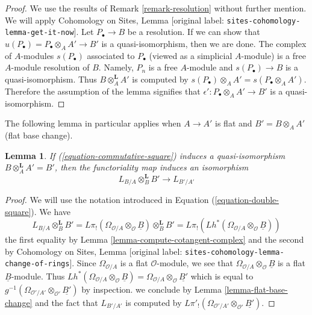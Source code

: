 \documentclass[10pt,a4paper]{article}
\theoremstyle{plain}
\newtheorem{lemma}[subsection]{Lemma}
\theoremstyle{definition}
\theoremstyle{remark}
\numberwithin{equation}{subsection}
\begin{document}
\begin{proof}
We use the results of Remark \ref{remark-resolution} without
further mention. We will apply Cohomology on Sites, Lemma
\textnormal{[original label: \nolinkurl{sites-cohomology-lemma-get-it-now}]}. Let $P_\bullet \to B$ be a resolution.
If we can show that $u(P_\bullet) = P_\bullet \otimes_A A' \to B'$
is a quasi-isomorphism, then we are done. The complex of $A$-modules
$s(P_\bullet)$ associated to $P_\bullet$ (viewed as a simplicial $A$-module)
is a free $A$-module resolution of $B$. Namely, $P_n$ is a free $A$-module and
$s(P_\bullet) \to B$ is a quasi-isomorphism. Thus $B \otimes_A^\mathbf{L} A'$
is computed by $s(P_\bullet) \otimes_A A' = s(P_\bullet \otimes_A A')$.
Therefore the assumption of the lemma signifies that
$\epsilon' : P_\bullet \otimes_A A' \to B'$ is a quasi-isomorphism.
\end{proof}

\noindent
The following lemma in particular applies when $A \to A'$ is flat
and $B' = B \otimes_A A'$ (flat base change).

\begin{lemma}
\label{lemma-flat-base-change-cotangent-complex}
If (\ref{equation-commutative-square}) induces a quasi-isomorphism
$B \otimes_A^\mathbf{L} A' = B'$, then the functoriality map
induces an isomorphism
$$
L_{B/A} \otimes_B^\mathbf{L} B' \longrightarrow L_{B'/A'}
$$
\end{lemma}

\begin{proof}
We will use the notation introduced in Equation (\ref{equation-double-square}).
We have
$$
L_{B/A} \otimes_B^\mathbf{L} B' =
L\pi_!(\Omega_{\mathcal{O}/A} \otimes_\mathcal{O} \underline{B})
\otimes_B^\mathbf{L} B' =
L\pi_!(Lh^*(\Omega_{\mathcal{O}/A} \otimes_\mathcal{O} \underline{B}))
$$
the first equality by Lemma \ref{lemma-compute-cotangent-complex}
and the second by Cohomology on Sites, Lemma
\textnormal{[original label: \nolinkurl{sites-cohomology-lemma-change-of-rings}]}.
Since $\Omega_{\mathcal{O}/A}$ is a flat $\mathcal{O}$-module,
we see that $\Omega_{\mathcal{O}/A} \otimes_\mathcal{O} \underline{B}$
is a flat $\underline{B}$-module. Thus
$Lh^*(\Omega_{\mathcal{O}/A} \otimes_\mathcal{O} \underline{B}) =
\Omega_{\mathcal{O}/A} \otimes_\mathcal{O} \underline{B'}$
which is equal to
$g^{-1}(\Omega_{\mathcal{O}'/A'} \otimes_{\mathcal{O}'} \underline{B'})$
by inspection.
we conclude by Lemma \ref{lemma-flat-base-change}
and the fact that $L_{B'/A'}$ is computed by
$L\pi'_!(\Omega_{\mathcal{O}'/A'} \otimes_{\mathcal{O}'} \underline{B'})$.
\end{proof}
\end{document}
